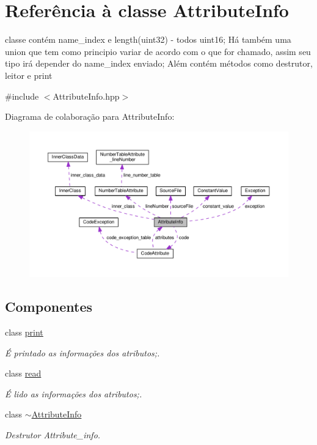 \hypertarget{class_attribute_info}{}\section{Referência à classe Attribute\+Info}
\label{class_attribute_info}


classe contém name\+\_\+index e length(uint32) -\/ todos uint16; Há também uma union que tem como principio variar de acordo com o que for chamado, assim seu tipo irá depender do name\+\_\+index enviado; Além contém métodos como destrutor, leitor e print  




{\ttfamily \#include $<$Attribute\+Info.\+hpp$>$}



Diagrama de colaboração para Attribute\+Info\+:
\nopagebreak
\begin{figure}[H]
\begin{center}
\leavevmode
\includegraphics[width=350pt]{class_attribute_info__coll__graph}
\end{center}
\end{figure}
\subsection*{Componentes}
\begin{DoxyCompactItemize}
\item 
class \hyperlink{class_attribute_info_1_1print}{print}
\begin{DoxyCompactList}\small\item\em É printado as informações dos atributos;. \end{DoxyCompactList}\item 
class \hyperlink{class_attribute_info_1_1read}{read}
\begin{DoxyCompactList}\small\item\em É lido as informações dos atributos;. \end{DoxyCompactList}\item 
class \hyperlink{class_attribute_info_1_1~_attribute_info}{$\sim$\+Attribute\+Info}
\begin{DoxyCompactList}\small\item\em Destrutor Attribute\+\_\+info. \end{DoxyCompactList}\end{DoxyCompactItemize}

